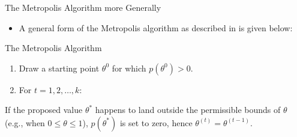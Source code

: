 \documentclass[handout]{beamer}
\begin{document}
\begin{frame}{The Metropolis Algorithm more Generally}
\scriptsize{

\begin{itemize}





\item A general form of the Metropolis algorithm as described in \cite{gelman2013bayesian} is given below:


\end{itemize}

\begin{block}{The Metropolis Algorithm}

\begin{enumerate}
 \item Draw a starting point $\theta^0$ for which $p(\theta^0)>0$.

 \item For $t=1,2,\dots,k:$


\end{enumerate}




\end{block}

If the proposed value $\theta^{*}$ happens to land outside the permissible bounds of $\theta$ (e.g., when $0\leq \theta \leq1$), $p(\theta^*)$  is set to zero, hence $\theta^{(t)}=\theta^{(t-1)}$.


}
\end{frame}
\end{document}
